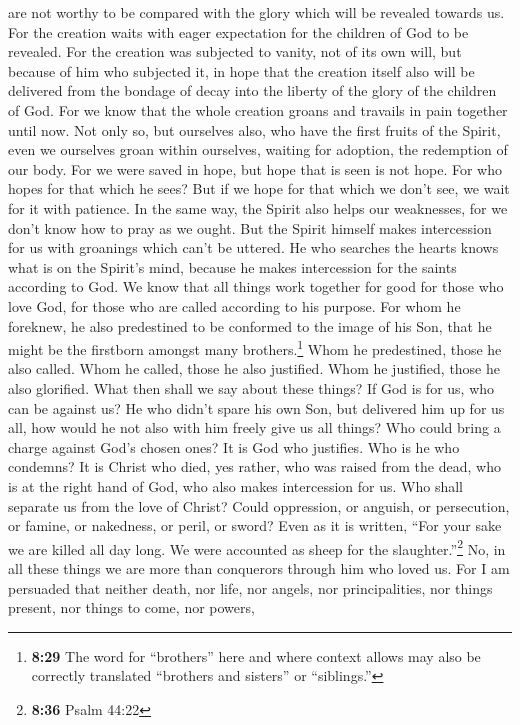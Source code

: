are not worthy to be compared with the glory which will be revealed
towards us.  For the creation waits with eager
expectation for the children of God to be revealed.  For
the creation was subjected to vanity, not of its own will, but because
of him who subjected it, in hope  that the creation
itself also will be delivered from the bondage of decay into the liberty
of the glory of the children of God.  For we know that
the whole creation groans and travails in pain together until now.
 Not only so, but ourselves also, who have the first
fruits of the Spirit, even we ourselves groan within ourselves, waiting
for adoption, the redemption of our body.  For we were
saved in hope, but hope that is seen is not hope. For who hopes for that
which he sees?  But if we hope for that which we don't
see, we wait for it with patience.  In the same way, the
Spirit also helps our weaknesses, for we don't know how to pray as we
ought. But the Spirit himself makes intercession for us with groanings
which can't be uttered.  He who searches the hearts knows
what is on the Spirit's mind, because he makes intercession for the
saints according to God.  We know that all things work
together for good for those who love God, for those who are called
according to his purpose.  For whom he foreknew, he also
predestined to be conformed to the image of his Son, that he might be
the firstborn amongst many brothers.\footnote{\textbf{8:29} The word for
  ``brothers'' here and where context allows may also be correctly
  translated ``brothers and sisters'' or ``siblings.''} 
Whom he predestined, those he also called. Whom he called, those he also
justified. Whom he justified, those he also glorified. 
What then shall we say about these things? If God is for us, who can be
against us?  He who didn't spare his own Son, but
delivered him up for us all, how would he not also with him freely give
us all things?  Who could bring a charge against God's
chosen ones? It is God who justifies.  Who is he who
condemns? It is Christ who died, yes rather, who was raised from the
dead, who is at the right hand of God, who also makes intercession for
us.  Who shall separate us from the love of Christ? Could
oppression, or anguish, or persecution, or famine, or nakedness, or
peril, or sword?  Even as it is written, ``For your sake
we are killed all day long. We were accounted as sheep for the
slaughter.''\footnote{\textbf{8:36} Psalm 44:22}  No, in
all these things we are more than conquerors through him who loved us.
 For I am persuaded that neither death, nor life, nor
angels, nor principalities, nor things present, nor things to come, nor
powers,

